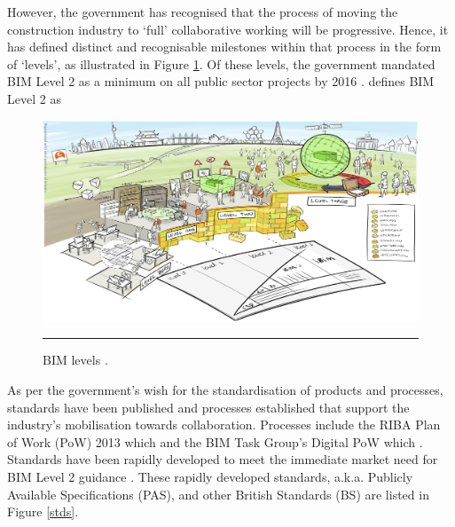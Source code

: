 However, the government has recognised that the process of moving the construction industry to `full' collaborative working will be progressive.
Hence, it has defined distinct and recognisable milestones within that process in the form of `levels', as illustrated in Figure \ref{levels}.
Of these levels, the government mandated BIM Level 2 as a minimum on all public sector projects by 2016 \citep{GCS11-15}.
\cite{NBS2014} defines BIM Level 2 as 

\begin{figure}[htbp]
	\centering
	\includegraphics[width=\textwidth]{figures/BIMlevels.png}
	\rule{\textwidth}{0.5pt} %
	\caption[BIM levels]{BIM levels \citep{BSI}.}
	\label{levels}
\end{figure}


As per the government's wish for the standardisation of products and processes, standards have been published and processes established that support the industry's mobilisation towards collaboration.
Processes include the RIBA Plan of Work (PoW) 2013 which  and the BIM Task Group's Digital PoW which  \citep{Fairhead2015:online}.
Standards have been rapidly developed to meet the immediate market need for BIM Level 2 guidance \citep{NBS2017}.
These rapidly developed standards, a.k.a. Publicly Available Specifications (PAS), and other British Standards (BS) are listed in Figure \ref{stds}.


